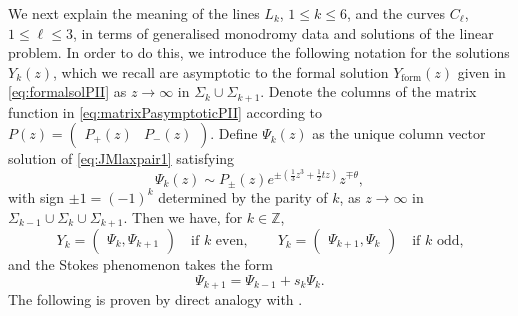 \documentclass[a4paper,reqno]{amsart}
\numberwithin{equation}{section}
\numberwithin{equation}{section}
\begin{document}
We next explain the meaning of the lines $L_k$, $1\leq k\leq 6$,  and the curves $C_{\ell}$, $1\leq \ell\leq3$, 
in terms of generalised monodromy data and solutions of the linear problem.
In order to do this, we introduce the following notation for the solutions $Y_k(z)$, which we recall are asymptotic to the formal solution $Y_{\operatorname{form}}(z)$ given in \cref{eq:formalsolPII} as $z\to\infty$ in $\Sigma_{k}\cup\Sigma_{k+1}$.
Denote the columns of the matrix function in \eqref{eq:matrixPasymptoticPII} according to $P(z)=\begin{pmatrix}
        P_+(z) & P_-(z)
    \end{pmatrix}.$
Define $\Psi_k(z)$ as the unique column vector solution of \eqref{eq:JMlaxpair1} satisfying
\begin{equation*}
    \Psi_k(z)\sim P_\pm(z)e^{\pm(\frac{1}{3}z^3+\frac{1}{2}tz)}z^{\mp \theta},
\end{equation*}
with sign $\pm 1=(-1)^k$ determined by the parity of $k$,
as $z\rightarrow \infty$ in $\Sigma_{k-1}\cup\Sigma_k\cup\Sigma_{k+1}$. Then we have, for $k\in\mathbb{Z}$,
\begin{equation*}
    Y_k=\begin{pmatrix}
        \Psi_k,\Psi_{k+1}
    \end{pmatrix}\quad \text{if $k$ even},\qquad
     Y_k=\begin{pmatrix}
        \Psi_{k+1},\Psi_k
    \end{pmatrix}\quad \text{if $k$ odd,}
\end{equation*}
and the Stokes phenomenon takes the form
\begin{equation*}
    \Psi_{k+1}=\Psi_{k-1}+s_k\Psi_k.
\end{equation*}
The following is proven by direct analogy with . 
\end{document}
